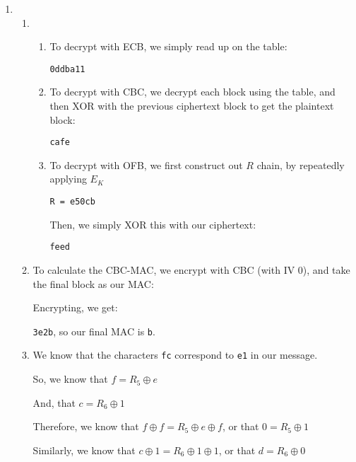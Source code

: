 


\begin{enumerate}[label=(\alph*)]

  \item
    \begin{enumerate}[label=(\roman*)]

      \item
        \begin{enumerate}[label=(\Alph*)]

          \item

            To decrypt with ECB, we simply read up on the table:

            \texttt{0ddba11}

          \item
            To decrypt with CBC, we decrypt each block using the table, and then XOR with the previous ciphertext block to get the plaintext block:

            \texttt{cafe}

          \item
            To decrypt with OFB, we first construct out $R$ chain, by repeatedly applying $E_K$

            \texttt{R = e50cb}

            Then, we simply XOR this with our ciphertext:

            \texttt{feed}

            
        \end{enumerate}

      \item
        To calculate the CBC-MAC, we encrypt with CBC (with IV 0), and take the final block as our MAC:

        Encrypting, we get:

        \texttt{3e2b}, so our final MAC is \texttt{b}.

      \item

        We know that the characters \texttt{fc} correspond to \texttt{e1} in our message.

        So, we know that $f = R_5 \oplus e$

        And, that $c = R_6 \oplus 1$

        Therefore, we know that $f \oplus f = R_5 \oplus e \oplus f$, or that $0 = R_5 \oplus 1$

        Similarly, we know that $c \oplus 1 = R_6 \oplus 1 \oplus 1$, or that $d = R_6 \oplus 0$


\end{enumerate}
\end{enumerate}
